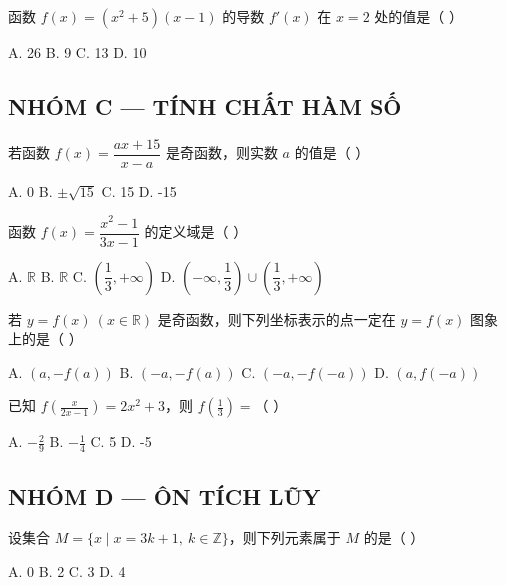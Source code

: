 \documentclass[11pt, a4paper]{article}
\begin{document}
\begin{baitap}[19]
函数 $f(x) = (x^2 + 5)(x - 1)$ 的导数 $f'(x)$ 在 $x = 2$ 处的值是（ ）
\par\vspace{3pt}
\noindent A. 26 \quad B. 9 \quad C. 13 \quad D. 10
\end{baitap}

\subsection*{NHÓM C — TÍNH CHẤT HÀM SỐ}

\begin{baitap}[20]
若函数 $f(x) = \dfrac{ax+15}{x-a}$ 是奇函数，则实数 $a$ 的值是（ ）
\par\vspace{3pt}
\noindent A. 0 \quad B. $\pm\sqrt{15}$ \quad C. 15 \quad D. -15
\end{baitap}

\begin{baitap}[21]
函数 $f(x) = \dfrac{x^2-1}{3x-1}$ 的定义域是（ ）
\par\vspace{3pt}
\noindent A. $\mathbb{R}$ \quad B. $\mathbb{R}$ \quad C. $\left(\dfrac{1}{3}, +\infty\right)$ \quad D. $\left(-\infty, \dfrac{1}{3}\right) \cup \left(\dfrac{1}{3}, +\infty\right)$
\end{baitap}

\begin{baitap}[22]
若 $y=f(x)\ (x\in\mathbb{R})$ 是奇函数，则下列坐标表示的点一定在 $y=f(x)$ 图象上的是（ ）
\par\vspace{3pt}
\noindent A. $(a,-f(a))$ \quad B. $(-a,-f(a))$ \quad C. $(-a,-f(-a))$ \quad D. $(a,f(-a))$
\end{baitap}

\begin{baitap}[23]
已知 $f\left(\frac{x}{2x-1}\right)=2x^2+3$，则 $f\left(\frac{1}{3}\right)=$（ ）
\par\vspace{3pt}
\noindent A. $-\frac{2}{9}$ \quad B. $-\frac{1}{4}$ \quad C. 5 \quad D. -5
\end{baitap}

\subsection*{NHÓM D — ÔN TÍCH LŨY}

\begin{baitap}[24]
设集合 $M=\{x\mid x=3k+1,\ k\in\mathbb Z\}$，则下列元素属于 $M$ 的是（ ）
\par\vspace{3pt}
\noindent A. 0 \quad B. 2 \quad C. 3 \quad D. 4
\end{baitap}
\end{document}
